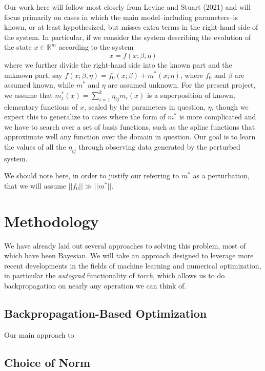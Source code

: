 \documentclass[12pt]{article}
\begin{document}
Our work here will follow most closely from Levine and Stuart (2021) and will focus primarily on cases in which the main model\---including parameters\---is known, or at least hypothesized, but misses extra terms in the right-hand side of the system. In particular, if we consider the system describing the evolution of the state $x \in \mathbb{R}^m$ according to the system $$\dot{x} = f(x;\beta, \eta)$$ where we further divide the right-hand side into the known part and the unknown part, say $f(x;\beta, \eta) = f_0(x; \beta) + m^*(x; \eta)$, where $f_0$ and $\beta$ are assumed known, while $m^*$ and $\eta$ are assumed unknown. For the present project, we assume that $m_j^*(x) = \sum_{i=1}^k \eta_{ij} m_i(x)$ is a superposition of known, elementary functions of $x$, scaled by the parameters in question, $\eta$, though we expect this to generalize to cases where the form of $m^*$ is more complicated and we have to search over a set of basis functions, such as the spline functions that approximate well any function over the domain in question. Our goal is to learn the values of all the $\eta_{ij}$ through observing data generated by the perturbed system.

We should note here, in order to justify our referring to $m^*$ as a perturbation, that we will assume $||f_0|| \gg ||m^*||$.




\section{Methodology}

We have already laid out several approaches to solving this problem, most of which have been Bayesian. We will take an approach designed to leverage more recent developments in the fields of machine learning and numerical optimization, in particular the \textit{autograd} functionality of \textit{torch}, which allows us to do backpropagation on nearly any operation we can think of.



\subsection{Backpropagation-Based Optimization}

Our main approach to



\subsection{Choice of Norm}
\end{document}
